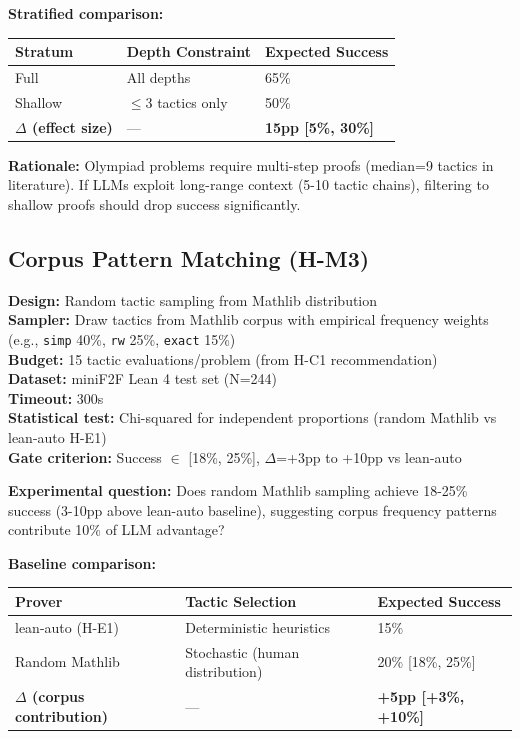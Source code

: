 \textbf{Stratified comparison:}

\begin{table}[h]
\centering
\small
\begin{tabular}{lll}
\toprule
\textbf{Stratum} & \textbf{Depth Constraint} & \textbf{Expected Success} \\
\midrule
Full & All depths & 65\% \\
Shallow & $\leq$3 tactics only & 50\% \\
\textbf{$\Delta$ (effect size)} & --- & \textbf{15pp [5\%, 30\%]} \\
\bottomrule
\end{tabular}
\end{table}

\textbf{Rationale:} Olympiad problems require multi-step proofs (median=9 tactics in literature). If LLMs exploit long-range context (5-10 tactic chains), filtering to shallow proofs should drop success significantly.

\subsection{Corpus Pattern Matching (H-M3)}

\textbf{Design:} Random tactic sampling from Mathlib distribution \\
\textbf{Sampler:} Draw tactics from Mathlib corpus with empirical frequency weights (e.g., \texttt{simp} 40\%, \texttt{rw} 25\%, \texttt{exact} 15\%) \\
\textbf{Budget:} 15 tactic evaluations/problem (from H-C1 recommendation) \\
\textbf{Dataset:} miniF2F Lean 4 test set (N=244) \\
\textbf{Timeout:} 300s \\
\textbf{Statistical test:} Chi-squared for independent proportions (random Mathlib vs lean-auto H-E1) \\
\textbf{Gate criterion:} Success $\in$ [18\%, 25\%], $\Delta$=+3pp to +10pp vs lean-auto

\textbf{Experimental question:} Does random Mathlib sampling achieve 18-25\% success (3-10pp above lean-auto baseline), suggesting corpus frequency patterns contribute 10\% of LLM advantage?

\textbf{Baseline comparison:}

\begin{table}[h]
\centering
\small
\begin{tabular}{lll}
\toprule
\textbf{Prover} & \textbf{Tactic Selection} & \textbf{Expected Success} \\
\midrule
lean-auto (H-E1) & Deterministic heuristics & 15\% \\
Random Mathlib & Stochastic (human distribution) & 20\% [18\%, 25\%] \\
\textbf{$\Delta$ (corpus contribution)} & --- & \textbf{+5pp [+3\%, +10\%]} \\
\bottomrule
\end{tabular}
\end{table}

